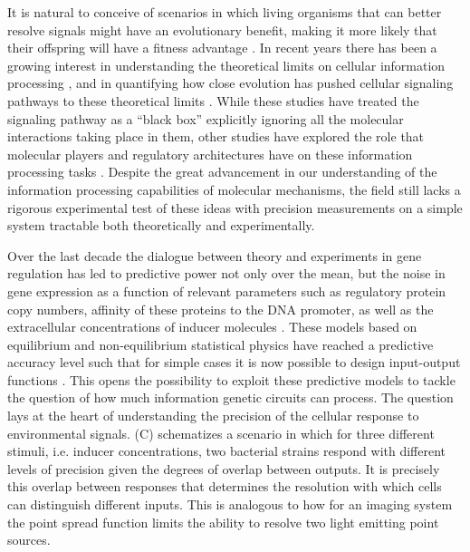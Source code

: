 It is natural to conceive of scenarios in which living organisms that can better
resolve signals might have an evolutionary benefit, making it more likely that
their offspring will have a fitness advantage \cite{Taylor2007a}. In recent
years there has been a growing interest in understanding the theoretical limits
on cellular information processing \cite{Bialek2005, Gregor2007}, and in
quantifying how close evolution has pushed cellular signaling pathways to these
theoretical limits \cite{Tkacik2008, Dubuis2013, Petkova2016}. While these
studies have treated the signaling pathway as a ``black box'' explicitly
ignoring all the molecular interactions taking place in them, other studies have
explored the role that molecular players and regulatory architectures have on
these information processing tasks \cite{Rieckh2014, Ziv2007, Voliotis2014a,
Tostevin2009, Tkacik2011, Tkacik2008a, Tabbaa2014}. Despite the great
advancement in our understanding of the information processing capabilities of
molecular mechanisms, the field still lacks a rigorous experimental test of
these ideas with precision measurements on a simple system tractable both
theoretically and experimentally.

Over the last decade the dialogue between theory and experiments in gene
regulation has led to predictive power not only over the mean, but the noise in
gene expression as a function of relevant parameters such as regulatory protein
copy numbers, affinity of these proteins to the DNA promoter, as well as the
extracellular concentrations of inducer molecules \cite{Garcia2011c, Jones2014a,
Brewster2014, Razo-Mejia2018} . These
models based on equilibrium and non-equilibrium statistical physics have reached
a predictive accuracy level such that for simple cases it is now possible to
design input-output functions \cite{Brewster2012, Barnes2018}. This opens the
possibility to exploit these predictive models to tackle the question of how
much information genetic circuits can process. The question lays at the heart of
understanding the precision of the cellular response to environmental signals.
(C) schematizes a scenario in which for three different
stimuli, i.e. inducer concentrations, two bacterial strains respond with
different levels of precision given the degrees of overlap between outputs. It
is precisely this overlap between responses that determines the resolution with
which cells can distinguish different inputs. This is analogous to how for an
imaging system the point spread function limits the ability to resolve two light
emitting point sources.

